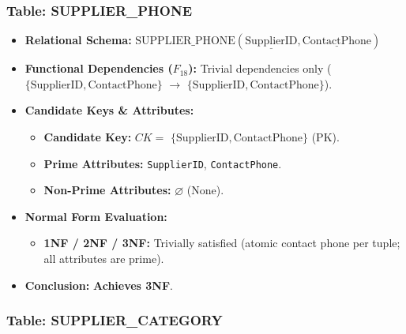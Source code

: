 \documentclass[a4paper,12pt]{report}
\providecommand{\tightlist}{%
  \setlength{\itemsep}{0pt}\setlength{\parskip}{0pt}}
\begin{document}
\subsubsection{\texorpdfstring{Table: SUPPLIER\_\allowbreak{}PHONE}{Table: SUPPLIERPHONE}}\label{table-supplier_phone}

\begin{itemize}
\item
  \textbf{Relational Schema:} \(\text{SUPPLIER\_PHONE}(\underline{\text{SupplierID}}, \underline{\text{ContactPhone}})\)
\item
  \textbf{Functional Dependencies (\(F_{18}\)):} Trivial dependencies only (\(\{\text{SupplierID}, \text{ContactPhone}\}\) \(\rightarrow\) \(\{\text{SupplierID}, \text{ContactPhone}\}\)).
\item
  \textbf{Candidate Keys \& Attributes:}

  \begin{itemize}
  \item
    \textbf{Candidate Key:} \(CK =\) \(\{\text{SupplierID}, \text{ContactPhone}\}\) (PK).
  \item
    \textbf{Prime Attributes:} \texttt{SupplierID}, \texttt{ContactPhone}.
  \item
    \textbf{Non-Prime Attributes:} \(\varnothing\) (None).
  \end{itemize}
\item
  \textbf{Normal Form Evaluation:}

  \begin{itemize}
  \tightlist
  \item
    \textbf{1NF / 2NF / 3NF:} Trivially satisfied (atomic contact phone per tuple; all attributes are prime).
  \end{itemize}
\item
  \textbf{Conclusion:} \textbf{Achieves 3NF}.
\end{itemize}

\subsubsection{\texorpdfstring{Table: SUPPLIER\_\allowbreak{}CATEGORY}{Table: SUPPLIERCATEGORY}}\label{table-supplier_category}
\end{document}
